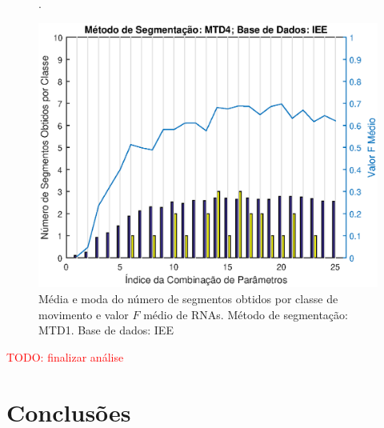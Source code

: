 \begin{figure}[htb]
	\caption{\label{fig:mtd4Iee}Média e moda do número de segmentos obtidos por classe de movimento e valor $F$ médio de RNAs. Método de segmentação: MTD1. Base de dados: IEE}.
	\begin{center}
	    \includegraphics[width=0.75\linewidth]{./img/matlab/results/mtd4_iee.eps}
	\end{center}
\end{figure}

\textcolor{red}{TODO: finalizar análise}

%
%

	\chapter{Conclusões}

